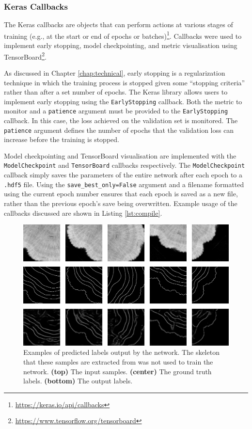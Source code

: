 \subsubsection{Keras Callbacks}

The Keras callbacks are objects that can perform actions at various stages of training (e.g., at the start or end of epochs or batches)\footnote{\url{https://keras.io/api/callbacks}}. Callbacks were used to implement early stopping, model checkpointing, and metric visualisation using TensorBoard\footnote{\url{https://www.tensorflow.org/tensorboard}}.

As discussed in Chapter \ref{chap:technical}, early stopping is a regularization technique in which the training process is stopped given some ``stopping criteria'' rather than after a set number of epochs. The Keras library allows users to implement early stopping using the \texttt{EarlyStopping} callback. Both the metric to monitor and a \texttt{patience} argument must be provided to the \texttt{EarlyStopping} callback. In this case, the loss achieved on the validation set is monitored. The \texttt{patience} argument defines the number of epochs that the validation loss can increase before the training is stopped.

Model checkpointing and TensorBoard visualisation are implemented with the \texttt{ModelCheckpoint} and \texttt{TensorBoard} callbacks respectively. The \texttt{ModelCheckpoint} callback simply saves the parameters of the entire network after each epoch to a \texttt{.hdf5} file. Using the \texttt{save\_best\_only=False} argument and a filename formatted using the current epoch number ensures that each epoch is saved as a new file, rather than the previous epoch's save being overwritten. Example usage of the callbacks discussed are shown in Listing \ref{lst:compile}.

\begin{figure}[t]
    \centering
    \includegraphics[width=1\textwidth]{images/initial-outputs.png}
    \caption{Examples of predicted labels output by the network. The skeleton that these samples are extracted from was not used to train the network. \textbf{(top)} The input samples. \textbf{(center)} The ground truth labels. \textbf{(bottom)} The output labels.}
    \label{fig:outputs}
\end{figure}

